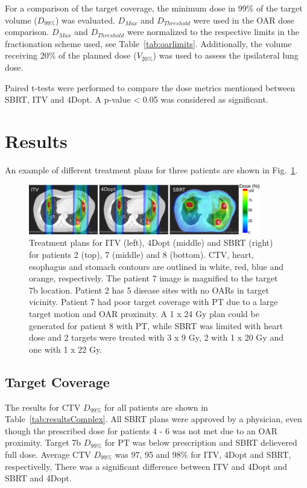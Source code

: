 For a comparison of the target coverage, the minimum dose in 99\% of the target volume ($D_{99\%}$) was evaluated. $D_{Max}$ and $D_{Threshold}$ were used in the OAR dose comparison. $D_{Max}$ and $D_{Threshold}$ were normalized to the respective limits
in the fractionation scheme used, see Table~\ref{tab:oarlimits}. Additionally, the volume receiving 20\% of the planned dose ($V_{20\%}$) was used to assess the ipsilateral lung dose.

Paired t-tests were performed to compare the dose metrics mentioned between SBRT, ITV and 4Dopt. A p-value < 0.05 was considered as significant. 

\section{Results}

An example of different treatment plans for three patients are shown in Fig.~\ref{Fig:multiExample}. 

\newpage
\begin{figure}[H]
	\begin{center}
		\includegraphics[width=0.9\textwidth]{./ComplexPatients/Images/multiExample.png}
		\caption{Treatment plans for ITV (left), 4Dopt (middle) and SBRT (right) for patients 2 (top), 7 (middle) and 8 (bottom). 
		CTV, heart, esophagus and stomach contours are outlined in white, red, blue and orange,
		respectively. The patient 7 image is magnified to the target 7b location. Patient 2 has 5 disease sites with no OARs in target vicinity. Patient 7 had poor target coverage
		with PT due to a large target motion and OAR proximity. A 1 x 24 Gy plan could be generated for patient 8 with PT, 
		while SBRT was limited with heart dose and 2 targets were treated with 3 x 9 Gy, 2 with 1 x 20 Gy and one with 1 x 22 Gy. }
		\label{Fig:multiExample}
	\end{center}
\end{figure}
\newpage
\subsection{Target Coverage}

The results for CTV $D_{99\%}$ for all patients are shown in Table~\ref{tab:resultsComplex}. All SBRT plans were approved by a physician, 
even though the prescribed dose for patients 4 - 6 was not met due to an OAR proximity. Target 7b $D_{99\%}$ for PT was below prescription and SBRT delievered full dose.
Average CTV $D_{99\%}$ was 97, 95 and 98\% for ITV, 4Dopt and SBRT, respectivelly, There was a significant difference between ITV and 4Dopt and SBRT and 4Dopt.


